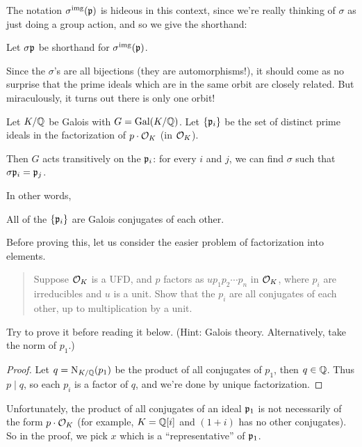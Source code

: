 The notation $\sigma^{\text{img}}(\mathfrak p)$ is hideous in this context,
since we're really thinking of $\sigma$ as just doing a group action,
and so we give the shorthand:
\begin{abuse}
	Let $\sigma\mathfrak p$ be shorthand for $\sigma^{\text{img}}(\mathfrak p)$.
\end{abuse}

Since the $\sigma$'s are all bijections (they are automorphisms!),
it should come as no surprise that the prime ideals which are in the same
orbit are closely related.
But miraculously, it turns out there is only one orbit!
\begin{theorem}
	\label{thm:galois_group_transitive}
	Let $K/\mathbb Q$ be Galois with $G = \operatorname{Gal}(K/\mathbb Q)$.
	Let $\{\mathfrak p_i\}$ be the set of distinct prime ideals in
	the factorization of $p \cdot \mathcal O_K$ (in $\mathcal O_K$).

	Then $G$ acts transitively on the $\mathfrak p_i$:
	for every $i$ and $j$, we can find $\sigma$ such that $\sigma\mathfrak p_i = \mathfrak p_j$.
\end{theorem}
In other words,
\begin{moral}
	All of the $\{\mathfrak p_i\}$ are Galois conjugates of each other.
\end{moral}

Before proving this, let us consider the easier problem
of factorization into elements.
\begin{quote}
	Suppose $\mathcal O_K$ is a UFD, and $p$ factors as $u p_1 p_2 \cdots p_n$ in
	$\mathcal O_K$, where $p_i$ are irreducibles and $u$ is a unit.
	Show that the $p_i$ are all conjugates of each other, up to
	multiplication by a unit.
\end{quote}
\begin{ques}
	Try to prove it before reading it below.
	(Hint: Galois theory. Alternatively, take the norm of $p_1$.)
\end{ques}
\begin{proof}
	Let $q=\operatorname{N}_{K/\mathbb Q}(p_1)$ be the product of all conjugates
	of $p_1$, then $q \in \mathbb Q$. Thus $p \mid q$, so each $p_i$ is a factor of
	$q$, and we're done by unique factorization.
\end{proof}

Unfortunately, the product of all conjugates of an ideal $\mathfrak p_1$ is not
necessarily of the form $p \cdot \mathcal O_K$ (for example, $K=\mathbb Q[i]$ and $(1+i)$
has no other conjugates). So in the proof, we pick $x$ which is a
``representative'' of $\mathfrak p_1$.


